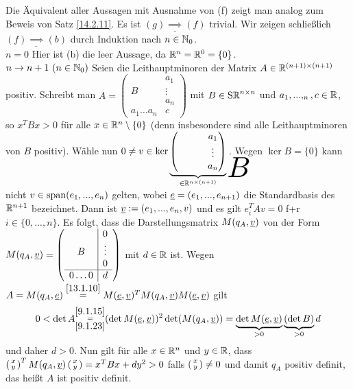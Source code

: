 \documentclass[../../main.tex]{subfiles}
\begin{document}
\begin{cproof}
Die Äquivalent aller Aussagen mit Ausnahme von (f) zeigt man analog zum Beweis von Satz \ref{14.2.11}. Es ist $\underline{(g)\implies (f)}$ trivial. Wir zeigen schließlich $\underline{(f)\implies (b)}$ durch Induktion nach $n\in\mathbb N_0$.\\

\noindent\underline{$n=0$} Hier ist (b) die leer Aussage, da $\mathbb R^n=\mathbb R^0=\{0\}$.\\
\noindent\underline{$n\to n+1\ (n\in\mathbb N_0)$} Seien die Leithauptminoren der Matrix $A\in\mathbb R^{(n+1)\times(n+1)}$ positiv. Schreibt man $A=\left(\begin{array}{c|c}& a_1\\
B & \vdots\\& a_n\\\hline a_1\ldots a_n & c\end{array}\right)$ mit $B\in \operatorname{S\mathbb R}^{n\times n}$ und $a_1,...,_n,c\in \mathbb R$, so $x^TBx>0$ für alle $x\in\mathbb R^{n}\setminus\{0\}$ (denn insbesondere sind alle Leithauptminoren von $B$ positiv). Wähle nun $0\neq v\in\ker\underbrace{\begin{pmatrix}\tikz\node[inner sep=0pt] (a) { };&&&a_1\\&&&\vdots\\&&&a_n\end{pmatrix}}_{\in \R^{n\times(n+1)}}
\begin{tikzpicture}[overlay]
\node at (a.north) [anchor=center,yshift=-0.5cm, xshift=0.4cm, scale=3] {$B$};
\end{tikzpicture}$. Wegen $\ker B=\{0\}$ kann nicht $v\in\operatorname{span}(e_1,...,e_n)$ gelten, wobei ${\underline e}=(e_1,...,e_{n+1})$ die Standardbasis des $\mathbb R^{n+1}$ bezeichnet. Dann ist ${\underline v}:=(e_1,...,e_n,v)$ und es gilt $e_i^TAv=0$ f+r $i\in\{0,...,n\}$. Es folgt, dass die Darstellungsmatrix $M(q_A,{\underline v})$ von der Form $M(q_A,{\underline v})=\left(\begin{array}{c|c}& 0\\
B & \vdots\\& 0\\\hline 0\ldots 0 & d\end{array}\right)$ mit $d\in\mathbb R$ ist. Wegen $A=M(q_A,{\underline e})\stackrel{\ref{13.1.10}}{=}M({\underline e},{\underline v})^TM(q_A,{\underline v})M({\underline e},{\underline v})$ gilt
\begin{align*}
0<\det A\substack{\ref{9.1.15}\\=\\\ref{9.1.23}}(\det M({\underline e},{\underline v}))^2\det(M(q_A,{\underline v}))=\underbrace{\det M({\underline e},{\underline v})}_{>0}\underbrace{(\det B)}_{>0}d
\end{align*}
und daher $d>0$. Nun gilt für alle $x\in \mathbb R^n$ und $y\in \mathbb R$, dass $\left(\begin{smallmatrix}x\\y\end{smallmatrix}\right)^TM(q_A,{\underline v})\left(\begin{smallmatrix}x\\y\end{smallmatrix}\right)=x^TBx+dy^2>0$ falls $\left(\begin{smallmatrix}x\\y\end{smallmatrix}\right)\neq 0$ und damit $q_A$ positiv definit, das heißt $A$ ist positiv definit.
\end{cproof}
\end{document}
